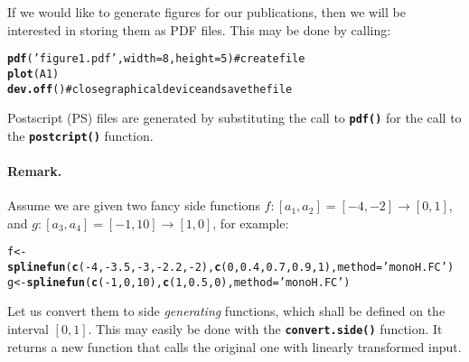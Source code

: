 \documentclass[11pt]{article}\usepackage{graphicx, color}
\makeatletter
\newcommand{\hlfunctioncall}[1]{\textcolor[rgb]{0.501960784313725,0,0.329411764705882}{\textbf{#1}}}%
\newcommand{\hlstring}[1]{\textcolor[rgb]{0.6,0.6,1}{#1}}%
\newcommand{\hlcomment}[1]{\textcolor[rgb]{0.180392156862745,0.6,0.341176470588235}{#1}}%
\newenvironment{kframe}{%
 \def\at@end@of@kframe{}%
 \ifinner\ifhmode%
  \def\at@end@of@kframe{\end{minipage}}%
  \begin{minipage}{\columnwidth}%
 \fi\fi%
 \def\FrameCommand##1{\hskip\@totalleftmargin \hskip-\fboxsep
 \colorbox{shadecolor}{##1}\hskip-\fboxsep
     \hskip-\linewidth \hskip-\@totalleftmargin \hskip\columnwidth}%
 \MakeFramed {\advance\hsize-\width
   \@totalleftmargin\z@ \linewidth\hsize
   \@setminipage}}%
 {\par\unskip\endMakeFramed%
 \at@end@of@kframe}
\newenvironment{knitrout}{}{} %
\newcommand{\func}[1]{\texttt{\hlfunctioncall{#1}}}
\makeatother
\begin{document}
\noindent
If we would like to generate figures for our publications,
then we will be interested in storing them as PDF files.
This may be done by calling:

\begin{knitrout}\small
{}\color{fgcolor}\begin{kframe}
\begin{alltt}
\hlfunctioncall{pdf}(\hlstring{'figure1.pdf'}, width=8, height=5) \hlcomment{# create file}
\hlfunctioncall{plot}(A1)
\hlfunctioncall{dev.off}() \hlcomment{# close graphical device and save the file}
\end{alltt}
\end{kframe}
\end{knitrout}


\noindent
Postscript (PS) files are generated by substituting the call
to \func{pdf()} for the call to the \func{postcript()} function.





\paragraph{Remark.}
Assume we are given two fancy side functions $f: [a_1,a_2]=[-4,-2]\to[0,1]$,
and $g: [a_3,a_4]=[-1,10]\to[1,0]$,
for example:

\begin{knitrout}\small
{}\color{fgcolor}\begin{kframe}
\begin{alltt}
f <- \hlfunctioncall{splinefun}(\hlfunctioncall{c}(-4,-3.5,-3,-2.2,-2), \hlfunctioncall{c}(0,0.4,0.7,0.9,1), method=\hlstring{'monoH.FC'})
g <- \hlfunctioncall{splinefun}(\hlfunctioncall{c}(-1,0,10), \hlfunctioncall{c}(1,0.5,0), method=\hlstring{'monoH.FC'})
\end{alltt}
\end{kframe}
\end{knitrout}


Let us convert them to side \textit{generating} functions, which shall be
defined on the interval $[0,1]$.
This may easily be done with the \func{convert.side()}
function. It returns a new function that calls
the original one with linearly transformed input.
\end{document}
